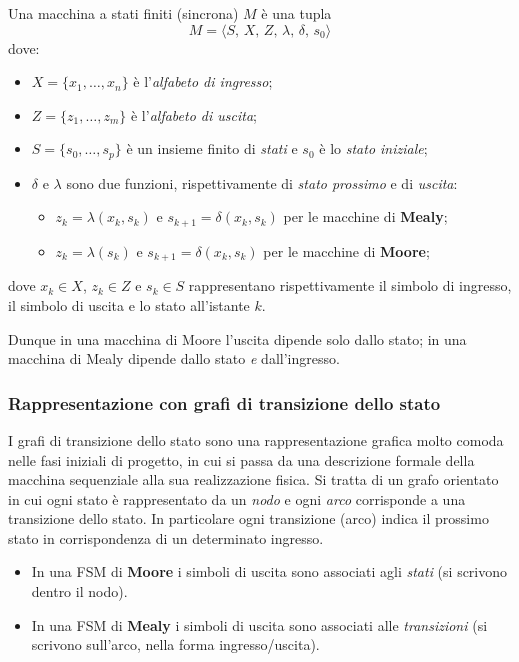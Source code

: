 \documentclass[11pt,a4paper]{article}
\begin{document}
\begin{definizione}
Una macchina a stati finiti (sincrona) $M$ è una tupla
\[
M = \langle S,\, X,\, Z,\, \lambda,\, \delta,\, s_0\rangle
\]
dove:
\begin{itemize}
    \item $X = \{x_1, \dots, x_n\}$ è l'\emph{alfabeto di ingresso};
    \item $Z = \{z_1, \dots, z_m\}$ è l'\emph{alfabeto di uscita};
    \item $S = \{s_0, \dots, s_p\}$ è un insieme finito di \emph{stati} e $s_0$ è lo \emph{stato iniziale};
    \item $\delta$ e $\lambda$ sono due funzioni, rispettivamente di \emph{stato prossimo} e di \emph{uscita}:
    \begin{itemize}
        \item $z_k = \lambda(x_k, s_k)$ e $s_{k+1} = \delta(x_k, s_k)$ per le macchine di \textbf{Mealy};
        \item $z_k = \lambda(s_k)$ e $s_{k+1} = \delta(x_k, s_k)$ per le macchine di \textbf{Moore};
    \end{itemize}
\end{itemize}
dove $x_k \in X$, $z_k \in Z$ e $s_k \in S$ rappresentano rispettivamente il simbolo di ingresso, il simbolo di uscita e lo stato all'istante $k$.
\end{definizione}

Dunque in una macchina di Moore l'uscita dipende solo dallo stato; in una macchina di Mealy dipende dallo stato \emph{e} dall'ingresso.

\subsubsection{Rappresentazione con grafi di transizione dello stato}

I grafi di transizione dello stato sono una rappresentazione grafica molto comoda nelle fasi iniziali di progetto, in cui si passa da una descrizione formale della macchina sequenziale alla sua realizzazione fisica. Si tratta di un grafo orientato in cui ogni stato è rappresentato da un \emph{nodo} e ogni \emph{arco} corrisponde a una transizione dello stato. In particolare ogni transizione (arco) indica il prossimo stato in corrispondenza di un determinato ingresso.
\begin{itemize}
    \item In una FSM di \textbf{Moore} i simboli di uscita sono associati agli \emph{stati} (si scrivono dentro il nodo).
    \item In una FSM di \textbf{Mealy} i simboli di uscita sono associati alle \emph{transizioni} (si scrivono sull'arco, nella forma ingresso/uscita).
\end{itemize}
\end{document}
